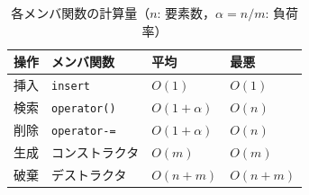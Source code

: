 \begin{table}[htbp]
\centering
\caption{各メンバ関数の計算量（$n$: 要素数，$\alpha = n/m$: 負荷率）}
\label{tab:complexity}
\begin{tabular}{llll}
\hline
操作 & メンバ関数 & 平均 & 最悪 \\
\hline
挿入 & {\tt insert}        & $O(1)$          & $O(1)$ \\
検索 & {\tt operator()}    & $O(1+\alpha)$   & $O(n)$ \\
削除 & {\tt operator-=}    & $O(1+\alpha)$   & $O(n)$ \\
生成 & コンストラクタ      & $O(m)$          & $O(m)$ \\
破棄 & デストラクタ        & $O(n+m)$        & $O(n+m)$ \\
\hline
\end{tabular}
\end{table}
